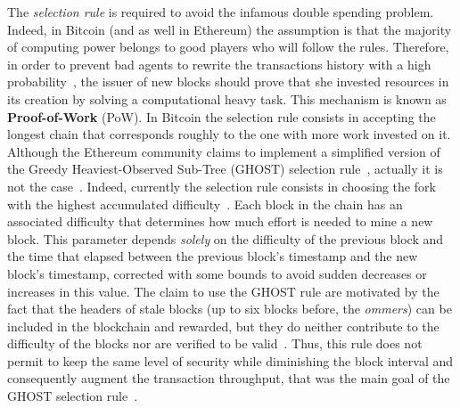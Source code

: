 The \emph{selection rule} is required to avoid the infamous double spending
problem. Indeed, in Bitcoin (and as well in Ethereum) the assumption is that the
majority of computing power belongs to good players who will follow the rules.
Therefore, in order to prevent bad agents to rewrite the transactions history
with a high probability~\cite{bib:bitcoin}, the issuer of new blocks should
prove that she invested resources in its creation by solving a computational
heavy task. This mechanism is known as \textbf{Proof-of-Work} (PoW). In Bitcoin
the selection rule consists in accepting the longest chain that corresponds
roughly to the one with more work invested on it. Although the Ethereum
community claims to implement a simplified version of the Greedy
Heaviest-Observed Sub-Tree (GHOST) selection rule~\cite{wood2018ethereum},
actually it is not the case~\cite{bib:securityAndScalabilityPoW}. Indeed,
currently the selection rule consists in choosing the fork with the highest
accumulated difficulty~\cite{wood2018ethereum}. Each block in the chain has an
associated difficulty that determines how much effort is needed to mine a new
block. This parameter depends \emph{solely} on the difficulty of the previous
block and the time that elapsed between the previous block's timestamp and the
new block's timestamp, corrected with some bounds to avoid sudden decreases or
increases in this value. The claim to use the GHOST rule are motivated by the
fact that the headers of stale blocks (up to six blocks before, the
\emph{ommers}) can be included in the blockchain and rewarded, but they do
neither contribute to the difficulty of the blocks nor are verified to be
valid~\cite{bib:securityAndScalabilityPoW}. Thus, this rule does not permit to
keep the same level of security while diminishing the block interval and
consequently augment the transaction throughput, that was the main goal of the
GHOST selection rule~\cite{bib:ghost}.



